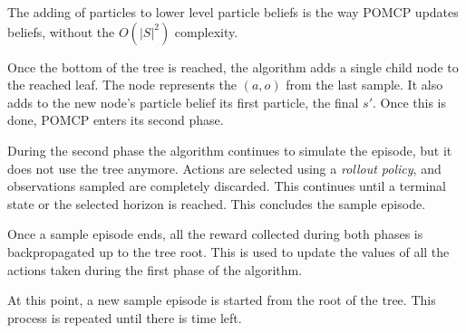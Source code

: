 The adding of particles to lower level particle beliefs is the way POMCP updates beliefs, without
the $O(|S|^2)$ complexity.

Once the bottom of the tree is reached, the algorithm adds a single child node to the reached leaf.
The node represents the $(a,o)$ from the last sample. It also adds to the new node's particle belief
its first particle, the final $s'$. Once this is done, POMCP enters its second phase.

During the second phase the algorithm continues to simulate the episode, but it does not use the
tree anymore. Actions are selected using a \textit{rollout policy}, and observations sampled are
completely discarded. This continues until a terminal state or the selected horizon is reached. This
concludes the sample episode.

Once a sample episode ends, all the reward collected during both phases is backpropagated up to the
tree root. This is used to update the values of all the actions taken during the first phase of the
algorithm.

At this point, a new sample episode is started from the root of the tree. This process is repeated
until there is time left.
